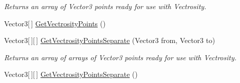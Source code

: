 \begin{DoxyCompactItemize}
\begin{DoxyCompactList}\small\item\em Returns an array of Vector3 points ready for use with Vectrosity.\end{DoxyCompactList}\item 
Vector3\mbox{[}$\,$\mbox{]} \hyperlink{class_g_f_grid_a8ee183793ee692d671e39aaa93f4928e_a8ee183793ee692d671e39aaa93f4928e}{Get\+Vectrosity\+Points} ()
\item 
Vector3\mbox{[}$\,$\mbox{]}\mbox{[}$\,$\mbox{]} \hyperlink{class_g_f_grid_a53cd898dc26179856ac298b5213e6dfb_a53cd898dc26179856ac298b5213e6dfb}{Get\+Vectrosity\+Points\+Separate} (Vector3 from, Vector3 to)
\begin{DoxyCompactList}\small\item\em Returns an array of arrays of Vector3 points ready for use with Vectrosity.\end{DoxyCompactList}\item 
Vector3\mbox{[}$\,$\mbox{]}\mbox{[}$\,$\mbox{]} \hyperlink{class_g_f_grid_a9c0d4962f326ba00115a40a2b82d0aa7_a9c0d4962f326ba00115a40a2b82d0aa7}{Get\+Vectrosity\+Points\+Separate} ()
\end{DoxyCompactItemize}
